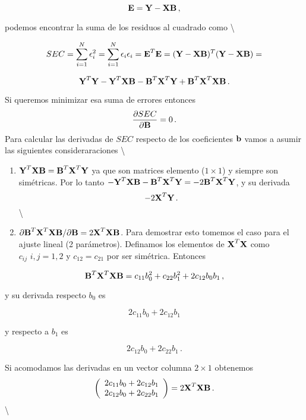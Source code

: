 \documentclass[
]{agujournal2019}
\begin{document}
\[{\textbf E}={\textbf Y}-{\textbf X}{\textbf B}\,,\]

podemos encontrar la suma de los residuos al cuadrado como
\textbackslash{}

\[SEC=\sum^N_{i=1} \epsilon^2_i=\sum^N_{i=1} \epsilon_i \epsilon_i=
{\textbf E}^T{\textbf E}=({\textbf Y}-{\textbf X}{\textbf B})^T({\textbf Y}-{\textbf X}{\textbf B})=\]

\[{\textbf Y}^T{\textbf Y} - {\textbf Y}^T{\textbf X}{\textbf B}-{\textbf B}^T{\textbf X}^T{\textbf Y}+{\textbf B}^T
{\textbf X}^T{\textbf X}{\textbf B}\,.\]

\noindent Si queremos minimizar esa suma de errores entonces
\[\frac{\partial{SEC}}{\partial{\textbf B}}=0\,.\] Para calcular las
derivadas de \({SEC}\) respecto de los coeficientes \({\textbf b}\)
vamos a asumir las siguientes consideraraciones \textbackslash{}

\begin{enumerate}
\def\labelenumi{(\roman{enumi})}
\item
  \({\textbf Y}^T{\textbf X}{\textbf B}={\textbf B}^T{\textbf X}^T{\textbf Y}\)
  ya que son matrices elemento (\(1\times1\)) y siempre son simétricas.
  Por lo tanto
  \(-{\textbf Y}^T{\textbf X}{\textbf B}-{\textbf B}^T{\textbf X}^T{\textbf Y}=-2{\textbf B}^T{\textbf X}^T{\textbf Y}\),
  y su derivada \[-2{\textbf X}^T{\textbf Y}\,.\] \textbackslash{}
\item
  \(\partial{{\textbf B}^T{\textbf X}^T{\textbf X}{\textbf B}}/\partial{\textbf B}=2{\textbf X}^T{\textbf X}{\textbf B}\).
  Para demostrar esto tomemos el caso para el ajuste lineal (2
  parámetros). Definamos los elementos de \({\textbf X}^T{\textbf X}\)
  como \(c_{ij}\,\,i,j=1,2\) y \(c_{12}=c_{21}\) por ser simétrica.
  Entonces
\end{enumerate}

\[{\textbf B}^T{\textbf X}^T{\textbf X}{\textbf B}=c_{11}b_0^2+c_{22}b_1^2 + 2c_{12} b_0 b_1\,,\]

y su derivada respecto \(b_0\) es

\[2c_{11}b_0 + 2c_{12}b_1\]

y respecto a \(b_1\) es

\[2c_{12}b_0 + 2c_{22}b_1\,.\]

Si acomodamos las derivadas en un vector columna \(2\times1\) obtenemos
\[\left(\begin{array}{c}
  2c_{11}b_0 + 2c_{12}b_1 \\
  2c_{12}b_0 + 2c_{22}b_1 \\
        \end{array}\right)=2{\textbf X}^T{\textbf X}{\textbf B}\,.\]
\textbackslash{}
\end{document}
